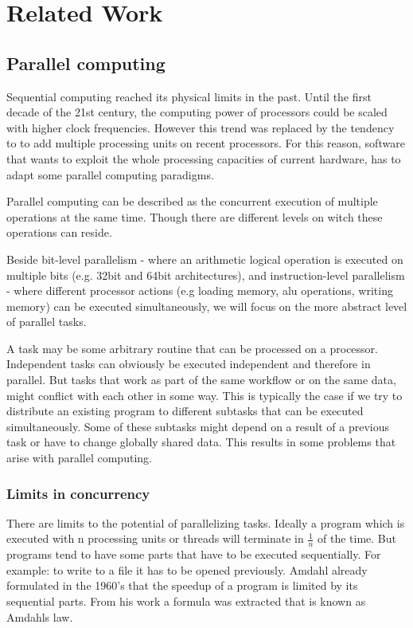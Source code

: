 \chapter{Related Work}

\section{Parallel computing}
Sequential computing reached its physical limits in the past. Until the first decade of the 21st century, the computing power of processors could be scaled with higher clock frequencies. However this trend was replaced by the tendency to to add multiple processing units on recent processors. For this reason, software that wants to exploit the whole processing capacities of current hardware, has to adapt some parallel computing paradigms.

Parallel computing can be described as the concurrent execution of multiple operations at the same time. Though there are different levels on witch these operations can reside.

Beside bit-level parallelism - where an arithmetic logical operation is executed on multiple bits (e.g. 32bit and 64bit architectures), and instruction-level parallelism \cite{wall1991limits} - where different processor actions (e.g loading memory, alu operations, writing memory) can be executed simultaneously, we will focus on the more abstract level of parallel tasks.

A task may be some arbitrary routine that can be processed on a processor. Independent tasks can obviously be executed independent and therefore in parallel. But tasks that work as part of the same workflow or on the same data, might conflict with each other in some way. This is typically the case if we try to distribute an existing program to different subtasks that can be executed simultaneously. Some of these subtasks might depend on a result of a previous task or have to change globally shared data. This results in some problems that arise with parallel computing.

\subsection{Limits in concurrency}
There are limits to the potential of parallelizing tasks. Ideally a program which is executed with n processing units or threads will terminate in $\frac{1}{n}$ of the time. But programs tend to have some parts that have to be executed sequentially. For example: to write to a file it has to be opened previously.
Amdahl already formulated in the 1960's \cite{amdahl1967validity} that the speedup of a program is limited by its sequential parts. From his work a formula was extracted that is known as Amdahls law.

